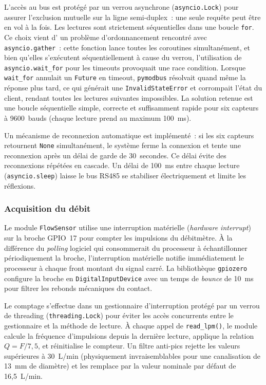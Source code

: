 L'accès au bus est protégé par un verrou asynchrone (\texttt{asyncio.Lock}) pour assurer l'exclusion mutuelle sur la ligne semi-duplex~: une seule requête peut être en vol à la fois. Les lectures sont strictement séquentielles dans une boucle \texttt{for}. Ce choix vient d' un problème d'ordonnancement rencontré avec \texttt{asyncio.gather}~: cette fonction lance toutes les coroutines simultanément, et bien qu'elles s'exécutent séquentiellement à cause du verrou, l'utilisation de \texttt{asyncio.wait\_for} pour les timeouts provoquait une race condition. Lorsque \texttt{wait\_for} annulait un \texttt{Future} en timeout, \texttt{pymodbus} résolvait quand même la réponse plus tard, ce qui générait une \texttt{InvalidStateError} et corrompait l'état du client, rendant toutes les lectures suivantes impossibles. La solution retenue est une boucle séquentielle simple, correcte et suffisamment rapide pour six capteurs à 9600~bauds (chaque lecture prend au maximum 100~ms).

Un mécanisme de reconnexion automatique est implémenté~: si les six capteurs retournent \texttt{None} simultanément, le système ferme la connexion et tente une reconnexion après un délai de garde de 30~secondes. Ce délai évite des reconnexions répétées en cascade. Un délai de 100~ms entre chaque lecture (\texttt{asyncio.sleep}) laisse le bus RS485 se stabiliser électriquement et limite les réflexions.

\subsubsection{Acquisition du débit}

Le module \texttt{FlowSensor} utilise une interruption matérielle (\emph{hardware interrupt}) sur la broche GPIO~17 pour compter les impulsions du débitmètre. À la différence du \emph{polling} logiciel qui consommerait du processeur à échantillonner périodiquement la broche, l'interruption matérielle notifie immédiatement le processeur à chaque front montant du signal carré. La bibliothèque \texttt{gpiozero} configure la broche en \texttt{DigitalInputDevice} avec un temps de \emph{bounce} de 10~ms pour filtrer les rebonds mécaniques du contact.

Le comptage s'effectue dans un gestionnaire d'interruption protégé par un verrou de threading (\texttt{threading.Lock}) pour éviter les accès concurrents entre le gestionnaire et la méthode de lecture. À chaque appel de \texttt{read\_lpm()}, le module calcule la fréquence d'impulsions depuis la dernière lecture, applique la relation \(Q = F / 7,5\), et réinitialise le compteur. Un filtre anti-pics rejette les valeurs supérieures à 30~L/min (physiquement invraisemblables pour une canalisation de 13~mm de diamètre) et les remplace par la valeur nominale par défaut de 16,5~L/min.

